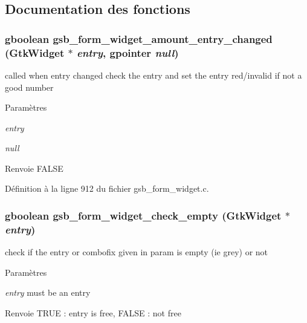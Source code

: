 \subsection{Documentation des fonctions}
\subsubsection[{gsb\_\-form\_\-widget\_\-amount\_\-entry\_\-changed}]{\setlength{\rightskip}{0pt plus 5cm}gboolean gsb\_\-form\_\-widget\_\-amount\_\-entry\_\-changed (GtkWidget $\ast$ {\em entry}, \/  gpointer {\em null})}\label{gsb__form__widget_8h_a7398bf4ce9d9bebb04a02f7a771a58fa}
called when entry changed check the entry and set the entry red/invalid if not a good number


\begin{DoxyParams}{Paramètres}
\item[{\em entry}]\item[{\em null}]\end{DoxyParams}
\begin{DoxyReturn}{Renvoie}
FALSE 
\end{DoxyReturn}


Définition à la ligne 912 du fichier gsb\_\-form\_\-widget.c.

\subsubsection[{gsb\_\-form\_\-widget\_\-check\_\-empty}]{\setlength{\rightskip}{0pt plus 5cm}gboolean gsb\_\-form\_\-widget\_\-check\_\-empty (GtkWidget $\ast$ {\em entry})}\label{gsb__form__widget_8h_ab190653d3c006279c4b0bc9bfea4d8c4}
check if the entry or combofix given in param is empty (ie grey) or not


\begin{DoxyParams}{Paramètres}
\item[{\em entry}]must be an entry\end{DoxyParams}
\begin{DoxyReturn}{Renvoie}
TRUE : entry is free, FALSE : not free 
\end{DoxyReturn}



